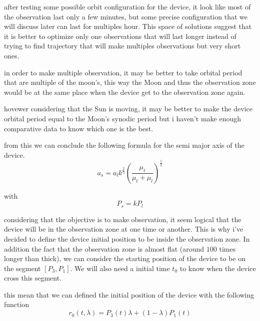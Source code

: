 \documentclass[11pt]{article} %
\begin{document}
		
		after testing some possible orbit configuration for the device, it look like most of the observation last only a few minutes, but some precise configuration that we will discuss later can last for multiples hour. This space of solutions suggest that it is better to optimize only one observations that will last longer instead of trying to find trajectory that will make multiples observations but very short ones.
		
		
		
		
		
		in order to make multiple observation, it may be better to take orbital period that are multiple of the moon's, this way the Moon and thus the observation zone would be at the same place when the device get to the observation zone again.
		
		hovewer considering that the Sun is moving, it may be better to make the device orbital period equal to the Moon's synodic period but i haven't make enough comparative data to know which one is the best.	
		
		from this we can conclude the following formula for the semi major axis of the device.
		$$
		a_s=a_lk^{\frac{2}{3}}\left(\frac{\mu_t}{\mu_t+\mu_l}\right)^\frac{1}{3}
		$$
		
		with
		$$
		P_s=kP_l
		$$
		
		considering that the objective is to make observation, it seem logical that the device will be in the observation zone at one time or another. This is why i've decided to define the device initial position to be inside the observation zone. In addition the fact that the observation zone is almost flat (around $100$ times longer than thick), we can consider the starting position of the device to be on the segment $[P_3,P_1]$. We will also need a initial time $t_0$ to know when the device cross this segment.
		
		this mean that we can defined the initial position of the device with the following function
		$$
		r_0(t,\lambda)=P_3(t)\lambda+(1-\lambda)P_1(t)
		$$
		
\end{document}
